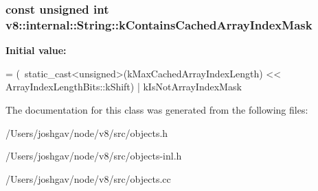 \subsubsection[{\texorpdfstring{k\+Contains\+Cached\+Array\+Index\+Mask}{kContainsCachedArrayIndexMask}}]{\setlength{\rightskip}{0pt plus 5cm}const unsigned int v8\+::internal\+::\+String\+::k\+Contains\+Cached\+Array\+Index\+Mask\hspace{0.3cm}{\ttfamily [static]}}\hypertarget{classv8_1_1internal_1_1_string_a10ac689de027a97f85ec6034e390cb04}{}\label{classv8_1_1internal_1_1_string_a10ac689de027a97f85ec6034e390cb04}
{\bfseries Initial value\+:}
\begin{DoxyCode}
=
      (~static\_cast<\textcolor{keywordtype}{unsigned}>(kMaxCachedArrayIndexLength)
       << ArrayIndexLengthBits::kShift) |
      kIsNotArrayIndexMask
\end{DoxyCode}


The documentation for this class was generated from the following files\+:\begin{DoxyCompactItemize}
\item 
/\+Users/joshgav/node/v8/src/objects.\+h\item 
/\+Users/joshgav/node/v8/src/objects-\/inl.\+h\item 
/\+Users/joshgav/node/v8/src/objects.\+cc\end{DoxyCompactItemize}
